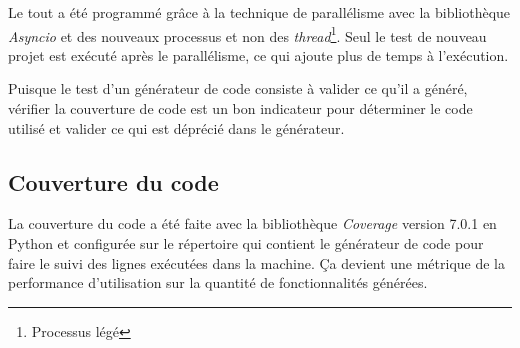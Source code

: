 Le tout a été programmé grâce à la technique de parallélisme avec la bibliothèque \textit{Asyncio} et des nouveaux processus et non des \textit{thread}\footnote{Processus légé}. Seul le test de nouveau projet est exécuté après le parallélisme, ce qui ajoute plus de temps à l’exécution.

Puisque le test d’un générateur de code consiste à valider ce qu’il a généré, vérifier la couverture de code est un bon indicateur pour déterminer le code utilisé et valider ce qui est déprécié dans le générateur.

\subsection{Couverture du code}
La couverture du code a été faite avec la bibliothèque \textit{Coverage} version 7.0.1 en Python et configurée sur le répertoire qui contient le générateur de code pour faire le suivi des lignes exécutées dans la machine. Ça devient une métrique de la performance d’utilisation sur la quantité de fonctionnalités générées.

